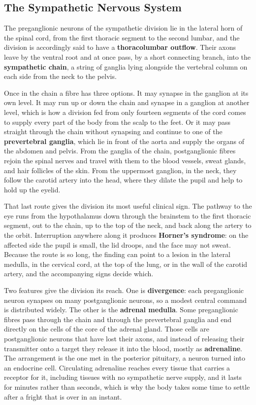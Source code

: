 \documentclass[11pt]{article}
\begin{document}
\subsection{The Sympathetic Nervous System}

The preganglionic neurons of the sympathetic division lie in the lateral horn of the spinal cord, from the first thoracic segment to the second lumbar, and the division is accordingly said to have a \textbf{thoracolumbar outflow}. Their axons leave by the ventral root and at once pass, by a short connecting branch, into the \textbf{sympathetic chain}, a string of ganglia lying alongside the vertebral column on each side from the neck to the pelvis.

Once in the chain a fibre has three options. It may synapse in the ganglion at its own level. It may run up or down the chain and synapse in a ganglion at another level, which is how a division fed from only fourteen segments of the cord comes to supply every part of the body from the scalp to the feet. Or it may pass straight through the chain without synapsing and continue to one of the \textbf{prevertebral ganglia}, which lie in front of the aorta and supply the organs of the abdomen and pelvis. From the ganglia of the chain, postganglionic fibres rejoin the spinal nerves and travel with them to the blood vessels, sweat glands, and hair follicles of the skin. From the uppermost ganglion, in the neck, they follow the carotid artery into the head, where they dilate the pupil and help to hold up the eyelid.

That last route gives the division its most useful clinical sign. The pathway to the eye runs from the hypothalamus down through the brainstem to the first thoracic segment, out to the chain, up to the top of the neck, and back along the artery to the orbit. Interruption anywhere along it produces \textbf{Horner's syndrome}: on the affected side the pupil is small, the lid droops, and the face may not sweat. Because the route is so long, the finding can point to a lesion in the lateral medulla, in the cervical cord, at the top of the lung, or in the wall of the carotid artery, and the accompanying signs decide which.

Two features give the division its reach. One is \textbf{divergence}: each preganglionic neuron synapses on many postganglionic neurons, so a modest central command is distributed widely. The other is the \textbf{adrenal medulla}. Some preganglionic fibres pass through the chain and through the prevertebral ganglia and end directly on the cells of the core of the adrenal gland. Those cells are postganglionic neurons that have lost their axons, and instead of releasing their transmitter onto a target they release it into the blood, mostly as \textbf{adrenaline}. The arrangement is the one met in the posterior pituitary, a neuron turned into an endocrine cell. Circulating adrenaline reaches every tissue that carries a receptor for it, including tissues with no sympathetic nerve supply, and it lasts for minutes rather than seconds, which is why the body takes some time to settle after a fright that is over in an instant.
\end{document}
